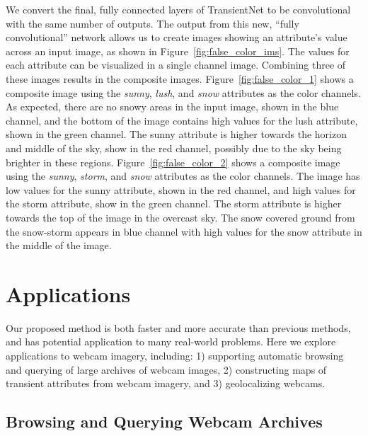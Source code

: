 \documentclass[10pt,twocolumn,letterpaper]{article}
\newcommand{\figref}[1]{Figure~\ref{fig:#1}}
\begin{document}
We convert the final, fully connected layers of TransientNet to be
convolutional~\cite{long2015fully} with the same number of outputs.  The output
from this new, ``fully convolutional'' network allows us to create images
showing an attribute's value across an input image, as shown in
\figref{false_color_ims}.  The values for each attribute can be visualized in a
single channel image.  Combining three of these images results in the composite
images.  \figref{false_color_1} shows a composite image using the
\textit{sunny}, \textit{lush}, and \textit{snow} attributes as the color
channels.  As expected, there are no snowy areas in the input image, shown in
the blue channel, and the bottom of the image contains high values for the lush
attribute, shown in the green channel.  The sunny attribute is higher towards
the horizon and middle of the sky, show in the red channel, possibly due to the
sky being brighter in these regions.  \figref{false_color_2} shows a composite
image using the \textit{sunny}, \textit{storm}, and \textit{snow} attributes as
the color channels.  The image has low values for the sunny attribute, shown in
the red channel, and high values for the storm attribute, show in the green
channel.  The storm attribute is higher towards the top of the image in the
overcast sky.  The snow covered ground from the snow-storm appears in blue
channel with high values for the snow attribute in the middle of the image.

\section{Applications}

Our proposed method is both faster and more accurate than previous methods, and
has potential application to many real-world problems.  Here we explore
applications to webcam imagery, including: 1) supporting automatic browsing and
querying of large archives of webcam images, 2) constructing maps of transient
attributes from webcam imagery, and 3) geolocalizing webcams.

\subsection{Browsing and Querying Webcam Archives}
\end{document}
